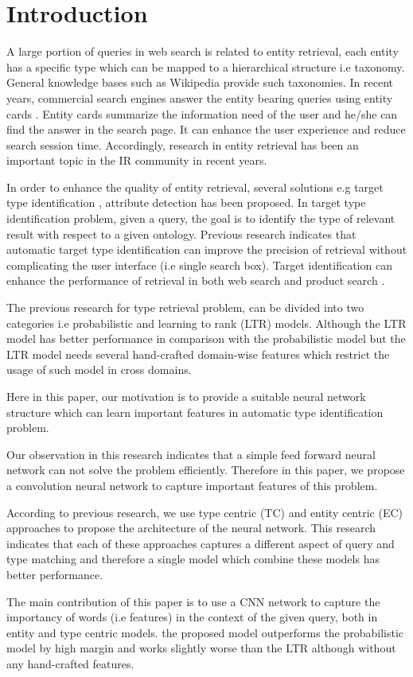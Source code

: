 \section{Introduction}\label{introduction}
\par
A large portion of queries in web search is related to entity retrieval, each entity has a specific type which can be mapped to a hierarchical structure i.e taxonomy. General knowledge bases such as Wikipedia provide such taxonomies. In recent years, commercial search engines answer the entity bearing queries using entity cards \cite{Pound:2010:AOR:1772690.1772769}. Entity cards summarize the information need of the user and he/she can find the answer in the search page. It can enhance the user experience and reduce search session time. Accordingly, research in entity retrieval has been an important topic in the IR community in recent years.
\par
In order to enhance the quality of entity retrieval, several solutions e.g target type identification \cite{Garigliotti:2017:TTI:3077136.3080659}, attribute detection \cite{DargahiNobari:2018:QUV:3269206.3269245} has been proposed. In target type identification problem,  given a query, the goal is to identify the type of relevant result with respect to a given ontology. Previous research indicates that automatic target type identification can improve the precision of retrieval without complicating the user interface (i.e single search box). Target identification can enhance the performance of retrieval in both web search and product search \cite{Balog:2011:QME:2037661.2037667, Kaptein:2013:ECS:2405838.2405908, pehcevski2010entity}.
\par
The previous research for type retrieval problem, can be divided into two categories i.e probabilistic and learning to rank (LTR) models. Although the LTR model has better performance in comparison with the probabilistic model but the LTR model needs several hand-crafted domain-wise features which restrict the usage of such model in cross domains.

Here in this paper, our motivation is to provide a suitable neural network structure which can learn important features in automatic type identification problem.

Our observation in this research indicates that a simple feed forward neural network can not solve the problem efficiently. Therefore in this paper, we propose a convolution neural network to capture important features of this problem. 

According to previous research, we use type centric (TC) and entity centric (EC) approaches to propose the architecture of the neural network. This research indicates that each of these approaches captures a different aspect of query and type matching and therefore a single model which combine these models has better performance.

The main contribution of this paper is to use a CNN network to capture the importancy of words (i.e features) in the context of the given query, both in entity and type centric models. the proposed model outperforms the probabilistic model by high margin and works slightly worse than the LTR although without any hand-crafted features.